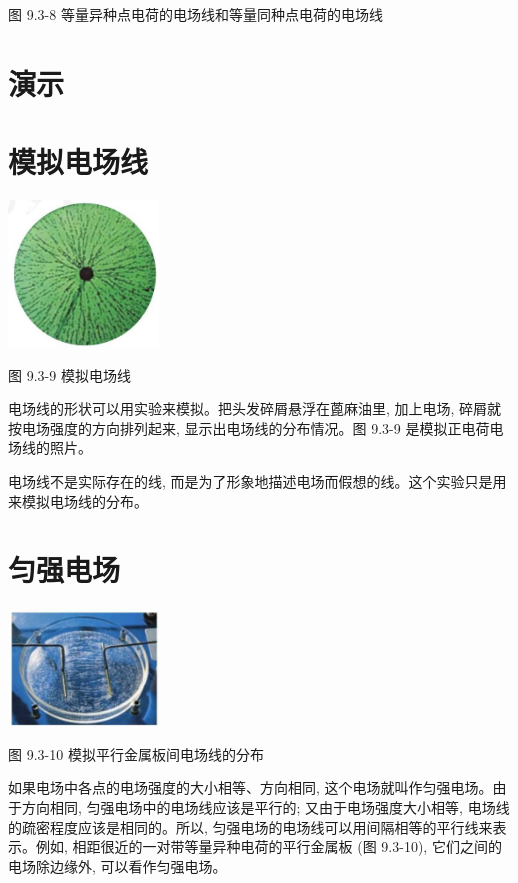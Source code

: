 \documentclass[10pt]{article}
\begin{document}
图 9.3-8 等量异种点电荷的电场线和等量同种点电荷的电场线

\section*{演示}

\section*{模拟电场线}

\begin{center}
\includegraphics[max width=0.3\textwidth]{images/01911d5f-8e38-70c0-b5b8-2b399bd115b6_20_942839.jpg}
\end{center}

图 9.3-9 模拟电场线

电场线的形状可以用实验来模拟。把头发碎屑悬浮在蓖麻油里, 加上电场, 碎屑就按电场强度的方向排列起来, 显示出电场线的分布情况。图 9.3-9 是模拟正电荷电场线的照片。

电场线不是实际存在的线, 而是为了形象地描述电场而假想的线。这个实验只是用来模拟电场线的分布。

\section*{匀强电场}

\begin{center}
\includegraphics[max width=0.3\textwidth]{images/01911d5f-8e38-70c0-b5b8-2b399bd115b6_21_450099.jpg}
\end{center}

图 9.3-10 模拟平行金属板间电场线的分布

如果电场中各点的电场强度的大小相等、方向相同, 这个电场就叫作匀强电场。由于方向相同, 匀强电场中的电场线应该是平行的; 又由于电场强度大小相等, 电场线的疏密程度应该是相同的。所以, 匀强电场的电场线可以用间隔相等的平行线来表示。例如, 相距很近的一对带等量异种电荷的平行金属板 (图 9.3-10), 它们之间的电场除边缘外, 可以看作匀强电场。
\end{document}
